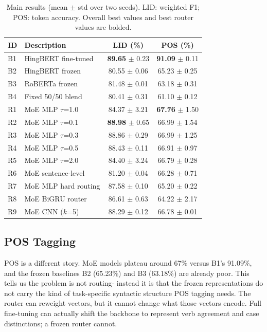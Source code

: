 \documentclass[conference]{IEEEtran}
\begin{document}
\begin{table}[t]
\centering
\caption{Main results (mean $\pm$ std over two seeds). LID: weighted F1; POS: token accuracy. Overall best values and best router values are bolded.}
\label{tab:main}
\setlength{\tabcolsep}{4pt}
\begin{tabular}{llcc}
\toprule
\textbf{ID} & \textbf{Description} & \textbf{LID (\%)} & \textbf{POS (\%)} \\
\midrule
B1 & HingBERT fine-tuned       & \textbf{89.65} $\pm$ 0.23 & \textbf{91.09} $\pm$ 0.11 \\
B2 & HingBERT frozen           & 80.55 $\pm$ 0.06          & 65.23 $\pm$ 0.25 \\
B3 & RoBERTa frozen            & 81.48 $\pm$ 0.01          & 63.18 $\pm$ 0.31 \\
B4 & Fixed 50/50 blend         & 80.41 $\pm$ 0.31          & 61.10 $\pm$ 0.12 \\
\midrule
R1 & MoE MLP $\tau$=1.0        & 84.37 $\pm$ 3.21          & \textbf{67.76} $\pm$ 1.50 \\
R2 & MoE MLP $\tau$=0.1        & \textbf{88.98} $\pm$ 0.65 & 66.99 $\pm$ 1.54 \\
R3 & MoE MLP $\tau$=0.3        & 88.86 $\pm$ 0.29          & 66.99 $\pm$ 1.25 \\
R4 & MoE MLP $\tau$=0.5        & 88.43 $\pm$ 0.11          & 66.91 $\pm$ 0.97 \\
R5 & MoE MLP $\tau$=2.0        & 84.40 $\pm$ 3.24          & 66.79 $\pm$ 0.28 \\
R6 & MoE sentence-level        & 81.20 $\pm$ 0.04          & 66.28 $\pm$ 0.71 \\
R7 & MoE MLP hard routing      & 87.58 $\pm$ 0.10          & 65.20 $\pm$ 0.22 \\
R8 & MoE BiGRU router          & 86.61 $\pm$ 0.63          & 64.22 $\pm$ 2.17 \\
R9 & MoE CNN ($k$=5)           & 88.29 $\pm$ 0.12          & 66.78 $\pm$ 0.01 \\
\bottomrule
\end{tabular}
\end{table}

\subsection{POS Tagging}

POS is a different story. MoE models plateau around 67\% versus B1's 91.09\%, and the frozen baselines B2 (65.23\%) and B3 (63.18\%) are already poor. This tells us the problem is not routing- instead it is that the frozen representations do not carry the kind of task-specific syntactic structure POS tagging needs. The router can reweight vectors, but it cannot change what those vectors encode. Full fine-tuning can actually shift the backbone to represent verb agreement and case distinctions; a frozen router cannot.
\end{document}
